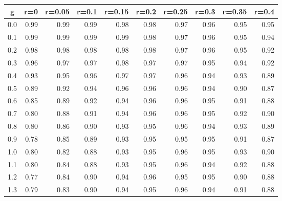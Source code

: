 %
\begin{table}[!tbp]
 \begin{center}
 \begin{tabular}{rrrrrrrrrr}\hline\hline
\multicolumn{1}{c}{g}&\multicolumn{1}{c}{r=0}&\multicolumn{1}{c}{r=0.05}&\multicolumn{1}{c}{r=0.1}&\multicolumn{1}{c}{r=0.15}&\multicolumn{1}{c}{r=0.2}&\multicolumn{1}{c}{r=0.25}&\multicolumn{1}{c}{r=0.3}&\multicolumn{1}{c}{r=0.35}&\multicolumn{1}{c}{r=0.4}\tabularnewline
\hline
0.0&0.99&0.99&0.99&0.98&0.98&0.97&0.96&0.95&0.95\tabularnewline
0.1&0.99&0.99&0.99&0.99&0.98&0.97&0.96&0.95&0.94\tabularnewline
0.2&0.98&0.98&0.98&0.98&0.98&0.97&0.96&0.95&0.92\tabularnewline
0.3&0.96&0.97&0.97&0.98&0.97&0.97&0.95&0.94&0.92\tabularnewline
0.4&0.93&0.95&0.96&0.97&0.97&0.96&0.94&0.93&0.89\tabularnewline
0.5&0.89&0.92&0.94&0.96&0.96&0.96&0.94&0.90&0.87\tabularnewline
0.6&0.85&0.89&0.92&0.94&0.96&0.96&0.95&0.91&0.88\tabularnewline
0.7&0.80&0.88&0.91&0.94&0.96&0.96&0.95&0.92&0.90\tabularnewline
0.8&0.80&0.86&0.90&0.93&0.95&0.96&0.94&0.93&0.89\tabularnewline
0.9&0.78&0.85&0.89&0.93&0.95&0.95&0.95&0.91&0.87\tabularnewline
1.0&0.80&0.82&0.88&0.93&0.95&0.96&0.95&0.93&0.90\tabularnewline
1.1&0.80&0.84&0.88&0.93&0.95&0.96&0.94&0.92&0.88\tabularnewline
1.2&0.77&0.84&0.90&0.94&0.96&0.95&0.95&0.90&0.88\tabularnewline
1.3&0.79&0.83&0.90&0.94&0.95&0.96&0.94&0.91&0.88\tabularnewline
\hline
\end{tabular}

\end{center}

\end{table}

